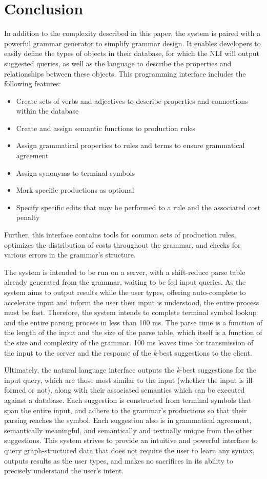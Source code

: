\documentclass{article}
\begin{document}
\section{Conclusion}
In addition to the complexity described in this paper, the system is paired with a powerful grammar generator to simplify grammar design. It enables developers to easily define the types of objects in their database, for which the NLI will output suggested queries, as well as the language to describe the properties and relationships between these objects. This programming interface includes the following features:
\begin{itemize}
\item Create sets of verbs and adjectives to describe properties and connections within the database
\item Create and assign semantic functions to production rules
\item Assign grammatical properties to rules and terms to ensure grammatical agreement
\item Assign synonyms to terminal symbols
\item Mark specific productions as optional
\item Specify specific edits that may be performed to a rule and the associated cost penalty
\end{itemize}
Further, this interface contains tools for common sets of production rules, optimizes the distribution of costs throughout the grammar, and checks for various errors in the grammar's structure.

The system is intended to be run on a server, with a shift-reduce parse table already generated from the grammar, waiting to be fed input queries. As the system aims to output results while the user types, offering auto-complete to accelerate input and inform the user their input is understood, the entire process must be fast. Therefore, the system intends to complete terminal symbol lookup and the entire parsing process in less than 100 ms. The parse time is a function of the length of the input and the size of the parse table, which itself is a function of the size and complexity of the grammar. 100 ms leaves time for transmission of the input to the server and the response of the \textit{k}-best suggestions to the client.

Ultimately, the natural language interface outputs the \textit{k}-best suggestions for the input query, which are those most similar to the input (whether the input is ill-formed or not), along with their associated semantics which can be executed against a database. Each suggestion is constructed from terminal symbols that span the entire input, and adhere to the grammar's productions so that their parsing reaches the  symbol. Each suggestion also is in grammatical agreement, semantically meaningful, and semantically and textually unique from the other suggestions. This system strives to provide an intuitive and powerful interface to query graph-structured data that does not require the user to learn any syntax, outputs results as the user types, and makes no sacrifices in its ability to precisely understand the user's intent.



\end{document}
